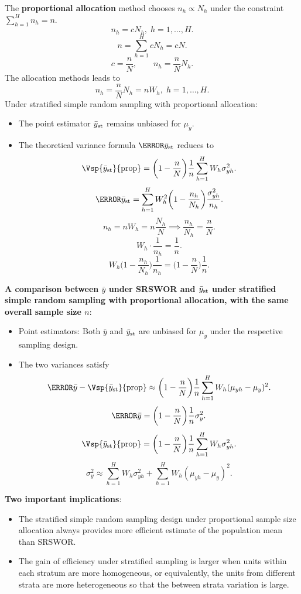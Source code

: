 The \textbf{proportional allocation} method chooses $ n_h\propto N_h $
under the constraint $ \sum_{h=1}^{H}n_h=n $.
\[ n_h=c N_h,\; h=1,\ldots,H. \]
\[ n=\sum_{h=1}^{H}c N_h=c N. \]
\[ c=\frac{n}{N},\qquad n_h=\frac{n}{N}N_h. \]
The allocation methods leads to
\[ n_h=\frac{n}{N}N_h=n W_h,\; h=1,\ldots,H. \]
Under stratified simple random sampling with proportional allocation:
\begin{itemize}
      \item The point estimator $ \bar{y}_{\text{st}} $ remains unbiased for $ \mu_y $.
      \item The theoretical variance formula $ \V{\bar{y}_{\st}} $ reduces to
            \[ \Vsp{\bar{y}_{\st}}{\text{prop}}=\biggl(1-\frac{n}{N}\biggr)\frac{1}{n}\sum_{h=1}^{H}W_h \sigma_{yh}^2. \]
            \[ \V{\bar{y}_{\st}}=\sum_{h=1}^{H}W_h^2\biggl(1-\frac{n_h}{N_h}\biggr)\frac{\sigma_{yh}^2}{n_h}. \]
            \[ n_h=n W_h=n \frac{N_h}{N}\implies \frac{n_h}{N_h}=\frac{n}{N}. \]
            \[ W_h\cdot \frac{1}{n_h}=\frac{1}{n}. \]
            \[ W_h\biggl(1-\frac{n_h}{N_h}\biggr)\frac{1}{n_h}=\biggl(1-\frac{n}{N}\biggr)\frac{1}{n}. \]
\end{itemize}
\textbf{A comparison between $ \bar{y} $ under SRSWOR and $ \bar{y}_{\text{st}} $ under stratified
      simple random sampling with proportional allocation, with the
      same overall sample size $n$}:
\begin{itemize}
      \item Point estimators: Both $ \bar{y} $ and $ \bar{y}_{\text{st}} $ are unbiased for $ \mu_y $ under
            the respective sampling design.
      \item The two variances satisfy
            \[ \V{\bar{y}}-\Vsp{\bar{y}_{\st}}{\text{prop}}\approx \biggl(1-\frac{n}{N}\biggr)\frac{1}{n}\sum_{h=1}^{H}W_h(\mu_{yh}-\mu_y)^2. \]
            \[ \V{\bar{y}}=\biggl(1-\frac{n}{N}\biggr)\frac{1}{n}\sigma_y^2. \]
            \[ \Vsp{\bar{y}_{\st}}{\text{prop}}=\biggl(1-\frac{n}{N}\biggr)\frac{1}{n}\sum_{h=1}^{H}W_h \sigma_{yh}^2. \]
            \[ \sigma_y^2\approx \sum_{h=1}^{H}W_h \sigma_{yh}^2+\sum_{h=1}^{H}W_h(\mu_{yh}-\mu_y)^2. \]
\end{itemize}
\textbf{Two important implications}:
\begin{itemize}
      \item The stratified simple random sampling design under proportional
            sample size allocation always provides more efficient estimate of
            the population mean than SRSWOR\@.
      \item The gain of efficiency under stratified sampling is larger when
            units within each stratum are more homogeneous, or
            equivalently, the units from different strata are more
            heterogeneous so that the between strata variation is large.
\end{itemize}
